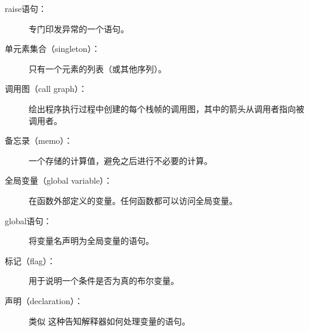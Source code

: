 \begin{description}
\item[raise语句：]  专门印发异常的一个语句。

  


\item[单元素集合（singleton）：] 只有一个元素的列表（或其他序列）。


\item[调用图（call graph）：] 绘出程序执行过程中创建的每个栈帧的调用图，其中的箭头从调用者指向被调用者。

  


\item[备忘录（memo）：] 一个存储的计算值，避免之后进行不必要的计算。



\item[全局变量（global variable）：]  在函数外部定义的变量。任何函数都可以访问全局变量。



\item[global语句：]  将变量名声明为全局变量的语句。

  


\item[标记（flag）：] 用于说明一个条件是否为真的布尔变量。



\item[声明（declaration）：] 类似  这种告知解释器如何处理变量的语句。


\end{description}

